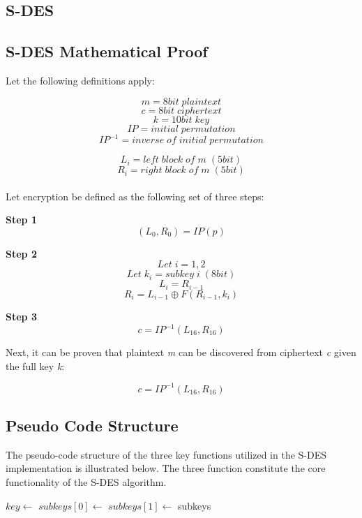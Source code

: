\documentclass[]{article}
\begin{document}
\vspace*{-0.8cm}
\begin{center}
	\section*{S-DES}
\end{center}

\vspace*{0.8cm}
\subsection*{S-DES Mathematical Proof}

Let the following definitions apply:

$$m = 8bit\;plaintext$$
$$c = 8bit\;ciphertext$$
$$k = 10bit\;key$$
$$IP = initial\;permutation$$
$$IP^{-1} = inverse\;of\;initial\;permutation$$

$$L_i = left\;block\;of\;m\;(5bit)$$
$$R_i = right\;block\;of\;m\;(5bit)$$\\

Let encryption be defined as the following set of three steps:\\

\begin{center}
\textbf{Step 1}
$$(L_0,R_0)=IP(p)$$

\textbf{Step 2}
$$Let\;i=1,2$$
$$Let\;k_i=subkey\;i\;(8bit)$$
$$L_i=R_{i-1}$$
$$R_i=L_{i-1}\oplus F(R_{i-1},k_i)$$

\textbf{Step 3}
$$c=IP^{-1}(L_{16},R_{16})$$
\end{center}

Next, it can be proven that plaintext \textit{m} can be discovered from ciphertext \textit{c} given the full key \textit{k}:

$$c=IP^{-1}(L_{16},R_{16})$$


\newpage
\subsection*{Pseudo Code Structure}

The pseudo-code structure of the three key functions utilized in the S-DES implementation is illustrated below. The three function constitute the core functionality of the S-DES algorithm.\\

\begin{algorithmic}
	\State $key\gets $ 
	\State {}
	\State $subkeys[0]\gets $ 
	\State {}
	\State $subkeys[1]\gets $ 
	\State \Return subkeys
\EndFunction
\end{algorithmic}
\end{document}
